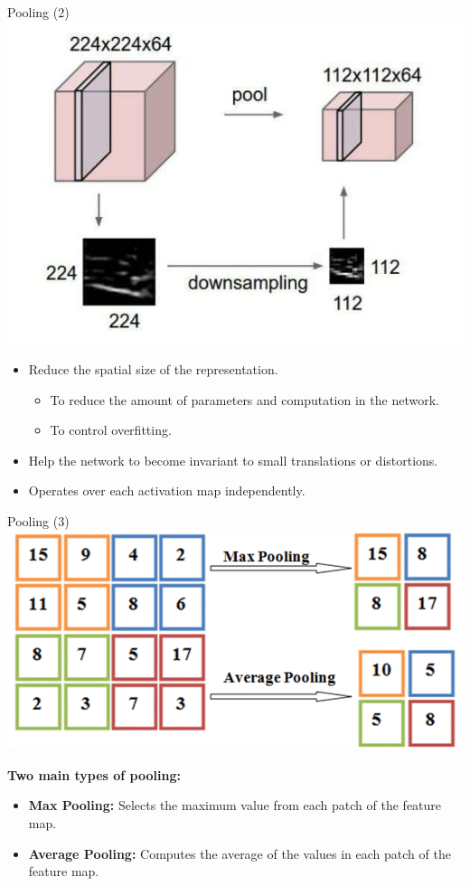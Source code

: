 \documentclass[serif, aspectratio=169]{beamer}
\begin{document}
	\begin{frame}{Pooling (2)}
		\centering 
		\includegraphics[keepaspectratio, scale=0.4]{pic/pooling1.png}
		\smallskip
		 \begin{itemize}
			\item Reduce the spatial size of the representation.
				\begin{itemize}
				\item To reduce the amount of parameters and computation in the network.
				\item To control overfitting.
			\end{itemize}
			\item Help the network to become invariant to small translations or distortions.
			\item Operates over each activation map independently.
		\end{itemize}
		
	\end{frame}
	\begin{frame}{Pooling (3)}
		\centering
		\includegraphics[keepaspectratio, scale=0.6]{pic/pooling2.png}
		\begin{flushleft}
			\textbf{Two main types of pooling:}
			\begin{itemize}		
				\item \textbf{Max Pooling:}  Selects the maximum value from each patch of the feature map.
				\item \textbf{Average Pooling:} Computes the average of the values in each patch of the feature map.
			\end{itemize}
		\end{flushleft}
	\end{frame}
\end{document}
